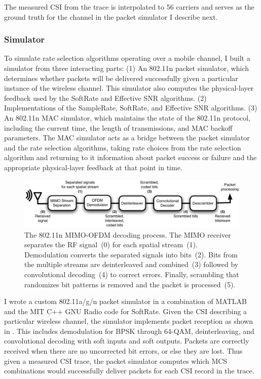 The measured CSI from the trace is interpolated to 56 carriers and serves as the ground truth for the channel in the packet simulator I describe next.

\subsubsection{Simulator}
To simulate rate selection algorithms operating over a mobile channel, I built a simulator from three interacting parts: (1) An 802.11n packet simulator, which determines whether packets will be delivered successfully given a particular instance of the wireless channel. This simulator also computes the physical-layer feedback used by the SoftRate and Effective SNR algorithms. (2) Implementations of the SampleRate, SoftRate, and Effective SNR algorithms. (3) An 802.11n MAC simulator, which maintains the state of the 802.11n protocol, including the current time, the length of transmissions, and MAC backoff parameters. The MAC simulator acts as a bridge between the packet simulator and the rate selection algorithms, taking rate choices from the rate selection algorithm and returning to it information about packet success or failure and the appropriate physical-layer feedback at that point in time.

\begin{figure}[t]
\centering
\includegraphics[width=6in]{figures/esnr/mimo_ofdm_decoding_process.pdf}
\caption[The 802.11n MIMO-OFDM decoding process]{\label{fig:ofdm_decoding} The 802.11n MIMO-OFDM decoding process. The MIMO receiver separates the RF signal~(0) for each spatial stream~(1). Demodulation converts the separated signals into bits~(2). Bits from the multiple streams are deinterleaved and combined~(3) followed by convolutional decoding~(4) to correct errors. Finally, scrambling that randomizes bit patterns is removed and the packet is processed~(5).}
\end{figure}

I wrote a custom 802.11a/g/n packet simulator in a combination of MATLAB and the MIT C++ GNU Radio code for SoftRate. Given the CSI describing  a particular wireless channel, the simulator implements packet reception as shown in . This includes demodulation for BPSK through 64-QAM, deinterleaving, and convolutional decoding with soft inputs and soft outputs. Packets are correctly received when there are no uncorrected bit errors, or else they are lost. Thus given a measured CSI trace, the packet simulator computes which MCS combinations would successfully deliver packets for each CSI record in the trace.

